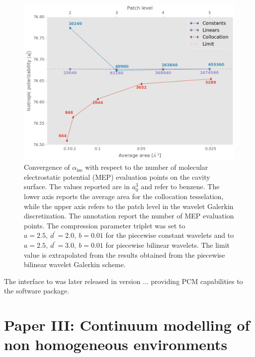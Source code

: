 \begin{figure}[tb]
 \centering
  \includegraphics[width=\textwidth]{gfx/wemlin/alpha_convergence.png}
  \caption[Convergence of $\alpha_\mathrm{iso}$ with respect to the number of molecular
  electrostatic potential (MEP) evaluation points on the cavity surface.]
  {Convergence of $\alpha_\mathrm{iso}$ with respect to the number of
   molecular electrostatic potential (MEP) evaluation points on the cavity
   surface.
   The values reported are in $a_0^3$ and refer to benzene.
   The lower axis reports the average area for the collocation
   tesselation, while the upper axis refers to the patch level in the
   wavelet Galerkin discretization. The annotation report the number of
   MEP evaluation points.
   The compression parameter triplet was set to $a = 2.5,\ d^\prime =
   2.0,\ b = 0.01$ for the piecewise constant wavelets and to $a = 2.5,\
   d^\prime = 3.0,\ b = 0.01$ for piecewise bilinear wavelets.
   The limit value is extrapolated from the results obtained from the
   piecewise bilinear wavelet Galerkin scheme.}
  \label{fig:alpha_convergence}
\end{figure}


The interface to \LSDALTON was later released in version ...
providing \acs{PCM} capabilities to the software package.

\section*{Paper III: Continuum modelling of non homogeneous environments}






